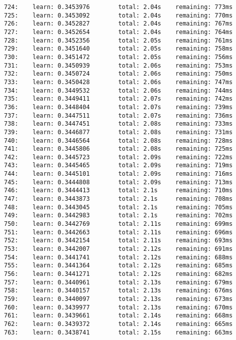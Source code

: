 \documentclass[11pt]{article}
\begin{document}
\begin{Verbatim}[commandchars=\\\{\}]
724:    learn: 0.3453976        total: 2.04s    remaining: 773ms
725:    learn: 0.3453092        total: 2.04s    remaining: 770ms
726:    learn: 0.3452827        total: 2.04s    remaining: 767ms
727:    learn: 0.3452654        total: 2.04s    remaining: 764ms
728:    learn: 0.3452356        total: 2.05s    remaining: 761ms
729:    learn: 0.3451640        total: 2.05s    remaining: 758ms
730:    learn: 0.3451472        total: 2.05s    remaining: 756ms
731:    learn: 0.3450939        total: 2.06s    remaining: 753ms
732:    learn: 0.3450724        total: 2.06s    remaining: 750ms
733:    learn: 0.3450428        total: 2.06s    remaining: 747ms
734:    learn: 0.3449532        total: 2.06s    remaining: 744ms
735:    learn: 0.3449411        total: 2.07s    remaining: 742ms
736:    learn: 0.3448404        total: 2.07s    remaining: 739ms
737:    learn: 0.3447511        total: 2.07s    remaining: 736ms
738:    learn: 0.3447451        total: 2.08s    remaining: 733ms
739:    learn: 0.3446877        total: 2.08s    remaining: 731ms
740:    learn: 0.3446564        total: 2.08s    remaining: 728ms
741:    learn: 0.3445806        total: 2.08s    remaining: 725ms
742:    learn: 0.3445723        total: 2.09s    remaining: 722ms
743:    learn: 0.3445465        total: 2.09s    remaining: 719ms
744:    learn: 0.3445101        total: 2.09s    remaining: 716ms
745:    learn: 0.3444808        total: 2.09s    remaining: 713ms
746:    learn: 0.3444413        total: 2.1s     remaining: 710ms
747:    learn: 0.3443873        total: 2.1s     remaining: 708ms
748:    learn: 0.3443045        total: 2.1s     remaining: 705ms
749:    learn: 0.3442983        total: 2.1s     remaining: 702ms
750:    learn: 0.3442769        total: 2.11s    remaining: 699ms
751:    learn: 0.3442663        total: 2.11s    remaining: 696ms
752:    learn: 0.3442154        total: 2.11s    remaining: 693ms
753:    learn: 0.3442007        total: 2.12s    remaining: 691ms
754:    learn: 0.3441741        total: 2.12s    remaining: 688ms
755:    learn: 0.3441364        total: 2.12s    remaining: 685ms
756:    learn: 0.3441271        total: 2.12s    remaining: 682ms
757:    learn: 0.3440961        total: 2.13s    remaining: 679ms
758:    learn: 0.3440157        total: 2.13s    remaining: 676ms
759:    learn: 0.3440097        total: 2.13s    remaining: 673ms
760:    learn: 0.3439977        total: 2.13s    remaining: 670ms
761:    learn: 0.3439661        total: 2.14s    remaining: 668ms
762:    learn: 0.3439372        total: 2.14s    remaining: 665ms
763:    learn: 0.3438741        total: 2.15s    remaining: 663ms

\end{Verbatim}
\end{document}
